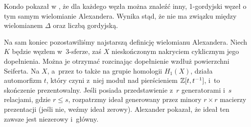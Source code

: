 
Kondo pokazał w \cite{kondo79}, że dla każdego węzła można znaleźć inny, 1-gordyjski węzeł o tym samym wielomianie Alexandera.
Wynika stąd, że nie ma związku między wielomianem $\Delta$ oraz liczbą gordyjską.

Na sam koniec pozostawiliśmy najstarszą definicję wielomianu Alexandera.
Niech $K$ będzie węzłem w~3-sferze, zaś $X$ nieskończonym nakryciem cyklicznym jego dopełnienia.
Można je otrzymać rozcinając dopełnienie wzdłuż powierzchni Seiferta.
Na $X$, a~przez to także na grupie homologii $H_1(X)$, działa automorfizm $t$, który czyni z~niej moduł nad pierścieniem $\mathbb Z[t, t^{-1}]$, i~to skończenie prezentowalny.
Jeśli posiada przedstawienie z~$r$ generatorami i~$s$ relacjami, gdzie $r \le s$, rozpatrzmy ideał generowany przez minory $r \times r$ macierzy prezentacji (jeśli nie, weźmy ideał zerowy).
Alexander pokazał, że ideał ten zawsze jest niezerowy i~główny.



